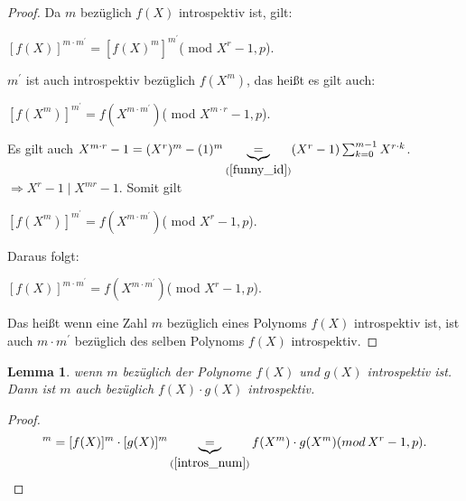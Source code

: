 \documentclass[12pt,oneside]{article}
\newtheorem{lemma}[theorem]{Lemma}
\theoremstyle{remark}
\theoremstyle{definition}
\begin{document}
\begin{proof}
Da $m$ bezüglich $f(X)$ introspektiv ist, gilt:\newline\newline
\centerline{$[f(X)]^{m \cdot m^{'}} = [f(X)^{m}]^{m^{'}}$( mod $X^r - 1, p$).}\newline\newline
$m^{'}$ ist auch introspektiv bezüglich $f(X^{m})$, das heißt es gilt auch:\newline\newline
\centerline{$[f(X^m)]^{m^{'}} = f(X^{m \cdot m^{'}})$( mod $X^{m\cdot r} - 1, p$).}\newline\newline

Es gilt auch $X^{m \cdot r } - 1 = (X^{r})^{m} - (1)^m \underbrace{=}_{(\ref{funny_id})} (X^{r} - 1) \sum_{k = 0}^{m-1} X^{r \cdot k}$.\newline\newline$\Rightarrow X^{r} - 1\mid X^{mr} - 1$. Somit gilt\newline\newline
\centerline{$[f(X^m)]^{m^{'}} = f(X^{m \cdot m^{'}})$( mod $X^{r} - 1,p$).}\newline

Daraus folgt:\newline\newline
\centerline{$[f(X)]^{m \cdot m^{'}} = f(X^{m \cdot m^{'}}) $( mod $X^r - 1, p$).}\newline

Das heißt wenn eine Zahl $m$ bezüglich eines Polynoms $f(X)$ introspektiv ist, ist auch $m \cdot m^{'}$ bezüglich des selben Polynoms $f(X)$ introspektiv. 
\end{proof}

\smallskip

\begin{lemma}\label{intros_pol}
wenn $m$ bezüglich der Polynome $f(X)$ und $g(X)$ introspektiv ist. Dann ist $m$ auch bezüglich $f(X) \cdot g(X)$ introspektiv.  
\end{lemma}
\begin{proof}
\begin{align*}
    [f(X) \cdot g(X)]^{m} = [f(X)]^m \cdot [g(X)]^m \underbrace{=}_{(\ref{intros_num})} f(X^m) \cdot g(X^m)(mod \, X^r - 1, p).
\end{align*}

\end{proof}
\end{document}
